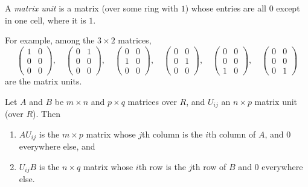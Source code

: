 \documentclass[12pt]{article}
\begin{document}
A \emph{matrix unit} is a matrix (over some ring with $1$) whose entries are all $0$ except in one cell, where it is $1$.

For example, among the $3\times 2$ matrices, 
$$
\begin{pmatrix}
1 & 0 \\
0 & 0 \\
0 & 0 
\end{pmatrix},\quad
\begin{pmatrix}
0 & 1 \\
0 & 0 \\
0 & 0 
\end{pmatrix},\quad
\begin{pmatrix}
0 & 0 \\
1 & 0 \\
0 & 0 
\end{pmatrix},\quad
\begin{pmatrix}
0 & 0 \\
0 & 1 \\
0 & 0 
\end{pmatrix},\quad
\begin{pmatrix}
0 & 0 \\
0 & 0 \\
1 & 0 
\end{pmatrix},\quad
\begin{pmatrix}
0 & 0 \\
0 & 0 \\
0 & 1 
\end{pmatrix}
$$
are the matrix units.

Let $A$ and $B$ be $m\times n$ and $p\times q$ matrices over $R$, and $U_{ij}$ an $n\times p$ matrix unit (over $R$).  Then 
\begin{enumerate}
\item
$AU_{ij}$ is the $m\times p$ matrix whose $j$th column is the $i$th column of $A$, and $0$ everywhere else, and
\item
$U_{ij}B$ is the $n\times q$ matrix whose $i$th row is the $j$th row of $B$ and $0$ everywhere else.
\end{enumerate}
\end{document}
